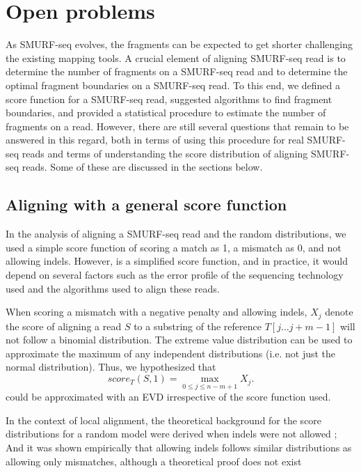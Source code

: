 \section{Open problems}
As SMURF-seq evolves, the fragments can be expected to get shorter
challenging the existing mapping tools. A crucial element of aligning
SMURF-seq read is to determine the number of fragments on a SMURF-seq
read and to determine the optimal fragment boundaries on a SMURF-seq
read. To this end, we defined a score function for a SMURF-seq read,
suggested algorithms to find fragment boundaries, and provided a
statistical procedure to estimate the number of fragments on a read.
%
However, there are still several questions that remain to be answered in
this regard, both in terms of using this procedure for real SMURF-seq
reads and terms of understanding the score distribution of aligning
SMURF-seq reads. Some of these are discussed in the sections below.


\subsection*{Aligning with a general score function}
In the analysis of aligning a SMURF-seq read and the random
distributions, we used a simple score function of scoring a match as 1, a
mismatch as 0, and not allowing indels. However, is a simplified score
function, and in practice, it would depend on several factors such as
the error profile of the sequencing technology used and the algorithms
used to align these reads.

When scoring a mismatch with a negative penalty and allowing indels,
$X_j$ denote the score of aligning a read $S$ to a substring of the
reference $T[j \dots j+m-1]$ will not follow a binomial distribution.
%
The extreme value distribution can be used to approximate the maximum of
any independent distributions (i.e. not just the normal distribution).
Thus, we hypothesized that \[score_T(S,1) = \max_{0 \leq j \leq n-m+1}
X_j.\]  could be approximated with an EVD irrespective of the score
function used.

In the context of local alignment, the theoretical background for the
score distributions for a random model were derived when indels were not
allowed \citep{}; And it was shown empirically that allowing indels
follows similar distributions as allowing only mismatches, although a
theoretical proof does not exist \citep{}

